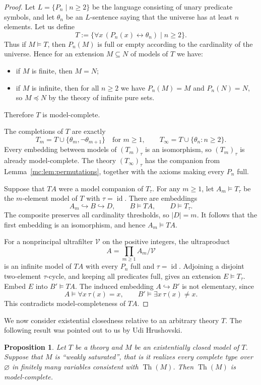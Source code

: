 \documentclass[11pt,a4paper]{amsart}
\renewcommand{\geq}{\geqslant}
\newtheorem{proposition}[theorem]{Proposition}
\theoremstyle{definition}
\DeclareMathOperator{\Th}{Th}
\DeclareMathOperator{\id}{id}
\begin{document}
\begin{proof} 
Let $L=\{P_n\mid n\geq 2\}$ be the language consisting of unary predicate symbols, and let
$\theta_n$ be an $L$-sentence saying that the universe has at least $n$ elements.
Let us define
\[
  T:=\{\forall x\,(P_n(x)\leftrightarrow\theta_n)\mid n\geq 2\}.
\]
Thus if $M\models T$, then $P_n(M)$ is full or empty according to the cardinality of the
universe. Hence for an extension $M\subseteq N$ of models of $T$ we have:
\begin{itemize}
  \item if $M$ is finite, then $M=N$;
  \item if $M$ is infinite, then for all $n\geq 2$ we have $P_n(M)=M$ and $P_n(N)=N$, so $M\preccurlyeq N$ by the theory of infinite pure sets.
\end{itemize}
Therefore $T$ is model-complete.

The completions of $T$ are exactly
\[
  T_m=T\cup\{\theta_m,\neg\theta_{m+1}\}\quad 
       \text{for $m\geq 1$},\qquad
  T_\infty=T\cup\{\theta_n:n\geq 2\}.
\]
Every embedding between models of $(T_m)_\tau$ is an isomorphism,
so $(T_m)_\tau$ is already model-complete. The theory
$(T_\infty)_\tau$ has the companion from
Lemma~\ref{mc:lem:permutations}, together with the axioms making
every $P_n$ full.

Suppose that $TA$ were a model companion of $T_\tau$. For any $m\geq 1$, let $A_m\models T_\tau$ be
the $m$-element model of $T$ with $\tau=\id$. There are embeddings
\[
  A_m\hookrightarrow B\hookrightarrow D,
  \qquad B\models TA,\qquad D\models T_\tau.
\]
The composite preserves all cardinality thresholds, so $|D|=m$.
It follows that the first embedding is an isomorphism, and hence
$A_m\models TA$.

For a nonprincipal ultrafilter $\mathcal V$ on the positive integers,
the ultraproduct
\[
  A=\prod_{m\geq 1}A_m/\mathcal V
\]
is an infinite model of $TA$ with every $P_n$ full and $\tau=\id$.
Adjoining a disjoint two-element $\tau$-cycle, and keeping all
predicates full, gives an extension $E\models T_\tau$. Embed $E$
into $B'\models TA$. The induced embedding $A\hookrightarrow B'$
is not elementary, since
\[
  A\models\forall x\,\tau(x)=x,
  \qquad B'\models\exists x\,\tau(x)\neq x.
\]
This contradicts model-completeness of $TA$.
\end{proof}

We now consider existential closedness relative to an arbitrary
theory $T$. The following result was pointed out to us by Udi Hrushovski.
\begin{proposition}\label{mc:prop:saturated-ec}
Let $T$ be a theory and $M$
be an existentially closed model of $T$. Suppose that $M$ is ``weakly saturated'', that is it
realizes every complete type over $\varnothing$ in finitely many
variables consistent with $\Th(M)$. Then $\Th(M)$
is model-complete.
\end{proposition}
\end{document}
